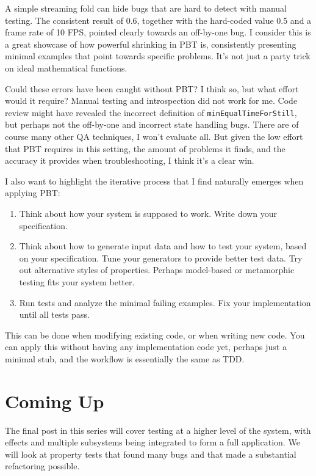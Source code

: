 A simple streaming fold can hide bugs that are hard to detect with manual testing. The consistent result of 0.6, together with the hard-coded value 0.5 and a frame rate of 10 FPS, pointed clearly towards an off-by-one bug. I consider this is a great showcase of how powerful shrinking in PBT is, consistently presenting minimal examples that point towards specific problems. It's not just a party trick on ideal mathematical functions.

Could these errors have been caught without PBT? I think so, but what effort would it require? Manual testing and introspection did not work for me. Code review might have revealed the incorrect definition of \texttt{minEqualTimeForStill}, but perhaps not the off-by-one and incorrect state handling bugs. There are of course many other QA techniques, I won't evaluate all. But given the low effort that PBT requires in this setting, the amount of problems it finds, and the accuracy it provides when troubleshooting, I think it's a clear win.

I also want to highlight the iterative process that I find naturally emerges when applying PBT:

\begin{enumerate}
\item Think about how your system is supposed to work. Write down your specification.
\item Think about how to generate input data and how to test your system, based on your specification. Tune your generators to provide better test data. Try out alternative styles of properties. Perhaps model-based or metamorphic testing fits your system better.
\item Run tests and analyze the minimal failing examples. Fix your implementation until all tests pass.
\end{enumerate}
This can be done when modifying existing code, or when writing new code. You can apply this without having any implementation code yet, perhaps just a minimal stub, and the workflow is essentially the same as TDD.

\section{Coming Up}

The final post in this series will cover testing at a higher level of the system, with effects and multiple subsystems being integrated to form a full application. We will look at property tests that found many bugs and that made a substantial refactoring possible.




